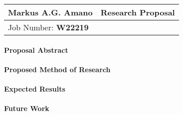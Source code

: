 \documentclass[fontsize=12pt]{article}
\begin{document}
\begin{center}
  \begin{tabularx}{\textwidth} { 
      >{\raggedright\arraybackslash}X 
    >{\raggedleft\arraybackslash}X  }
    \huge Markus A.G. Amano & Research Proposal\\
    \hline
    Job Number: \textbf{W22219} & \\
  \end{tabularx}
\end{center}


\paragraph{Proposal Abstract}


\paragraph{Proposed Method of Research}

\paragraph{Expected Results}

\paragraph{Future Work}
\end{document}
